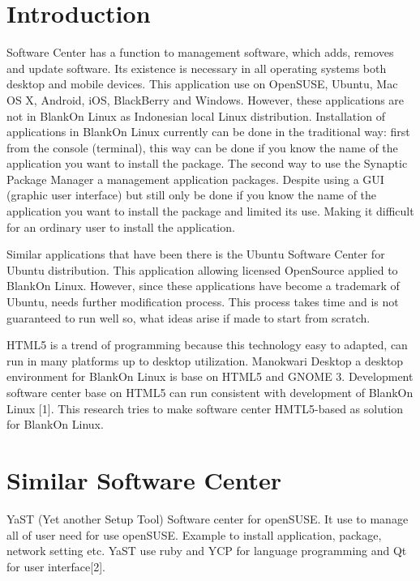 \documentclass[conference, letterpaper]{IEEEtran}
\begin{document}
\section{Introduction}
Software Center has a function to management software, which adds, removes and update software. Its existence is necessary in all operating systems both desktop and mobile devices. This application use on OpenSUSE, Ubuntu, Mac OS X, Android, iOS, BlackBerry and Windows. However, these applications are not in BlankOn Linux as Indonesian local Linux distribution. Installation of applications in BlankOn Linux currently can be done in the traditional way: first from the console (terminal), this way can be done if you know the name of the application you want to install the package. The second way to use the Synaptic Package Manager a management application packages. Despite using a GUI (graphic user interface) but still only be done if you know the name of the application you want to install the package and limited its use. Making it difficult for an ordinary user to install the application.

Similar applications that have been there is the Ubuntu Software Center for Ubuntu distribution. This application allowing licensed OpenSource applied to BlankOn Linux. However, since these applications have become a trademark of Ubuntu, needs further modification process. This process takes time and is not guaranteed to run well so, what ideas arise if made ​​to start from scratch.

HTML5 is a trend of programming because this technology easy to adapted, can run in many platforms up to desktop utilization. Manokwari Desktop a desktop environment for BlankOn Linux is base on HTML5 and GNOME 3. Development software center base on HTML5 can run consistent with development of BlankOn Linux [1]. This research tries to make software center HMTL5-based as solution for BlankOn Linux.

\section{Similar Software Center}

YaST (Yet another Setup Tool)
Software center for openSUSE. It use to manage all of user need for use openSUSE. Example to install application, package, network setting etc. YaST use ruby and YCP for language programming and Qt for user interface[2].
\end{document}
